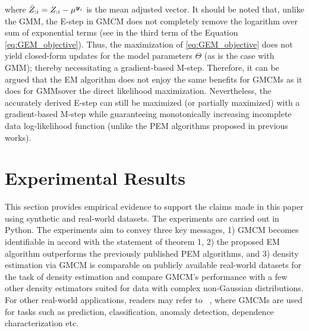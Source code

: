 \documentclass{article}
\theoremstyle{plain}
\theoremstyle{definition}
\theoremstyle{remark}
\begin{document}
where $\bar{Z}_{:{i}}=Z_{:i}-\mu^{\boldsymbol{y}_i}$ is the mean adjusted vector. It should be noted that, unlike the GMM, the E-step in GMCM does not completely remove the logarithm over sum of exponential terms (see in the third term of the Equation \ref{eq:GEM_objective}). Thus, the maximization of \eqref{eq:GEM_objective} does not yield closed-form updates for the model parameters $\Theta$ (as is the case with GMM); thereby necessitating a gradient-based M-step. Therefore, it can be argued that the EM algorithm does not enjoy the same benefits for GMCMs \textemdash as it does for GMMs\textemdash over the direct likelihood maximization. Nevertheless, the accurately derived E-step can still be maximized (or partially maximized) with a gradient-based M-step while guaranteeing monotonically increasing incomplete data log-likelihood function (unlike the PEM algorithms proposed in previous works).

\section{Experimental Results}\label{sec:Experimental}
This section provides empirical evidence to support the claims made in this paper using synthetic and real-world datasets. The experiments are carried out in Python.  The experiments aim to convey three key messages, 1) GMCM becomes identifiable in accord with the statement of theorem 1, 2) the proposed EM algorithm outperforms the previously published  PEM algorithms, and 3) density estimation via GMCM is comparable on  publicly available real-world datasets for the task of density estimation and compare GMCM's performance with a few other density estimators suited for data with complex non-Gaussian distributions. For other real-world applications, readers may refer to ~\cite{Bilgrau2012quantification,Wang2014,Yu2013GMCMWindPred,Bayestehtashk2015}, where GMCMs are used for tasks such as prediction, classification, anomaly detection, dependence characterization etc.
\end{document}
